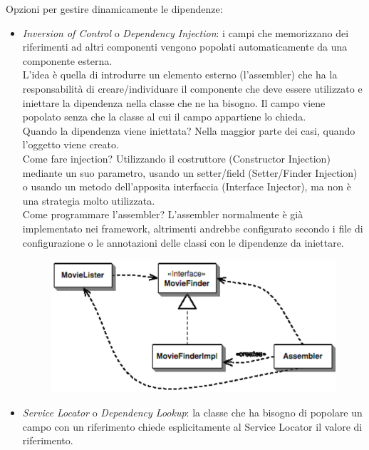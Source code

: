 Opzioni per gestire dinamicamente le dipendenze:
\begin{itemize}
    \item \textit{Inversion of Control} o \textit{Dependency Injection}: i campi che memorizzano dei riferimenti ad altri componenti vengono popolati automaticamente da una componente esterna.\\
    
    L’idea è quella di introdurre un elemento esterno (l’assembler) che ha la responsabilità di creare/individuare il componente che deve essere utilizzato e iniettare la dipendenza nella classe che ne ha bisogno. Il campo viene popolato senza che la classe al cui il campo appartiene lo chieda. \\
    
    Quando la dipendenza viene iniettata? Nella maggior parte dei casi, quando l’oggetto viene creato.\\
     
    Come fare injection? Utilizzando il costruttore (Constructor Injection) mediante un suo parametro, usando un setter/field (Setter/Finder Injection) o usando un metodo dell’apposita interfaccia (Interface Injector), ma non è una strategia molto utilizzata.\\
    
    Come programmare l’assembler? L’assembler normalmente è già implementato nei framework, altrimenti andrebbe configurato secondo i file di configurazione o le annotazioni delle classi con le dipendenze da iniettare.
    \begin{figure}[H]
        \centering
        \includegraphics[scale=0.4]{Imm/inversion_control.png}
    \end{figure}
    
    \item \textit{Service Locator} o \textit{Dependency Lookup}: la classe che ha bisogno di popolare un campo con un riferimento chiede esplicitamente al Service Locator il valore di riferimento.\\
    

\end{itemize}
